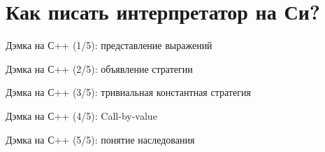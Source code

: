 \section{Как писать интерпретатор на Си?}
\begin{frame}{Дэмка на С++ (1/5): представление выражений}
\cast
\end{frame}

\begin{frame}{Дэмка на С++ (2/5): объявление стратегии}
\strat
\end{frame}

\begin{frame}{Дэмка на С++ (3/5): тривиальная константная стратегия}
\nostrat
\end{frame}

\begin{frame}{Дэмка на С++ (4/5): Call-by-value}
\vspace{-0.5em}
\cbvstrat
\end{frame}
\begin{frame}{Дэмка на С++ (5/5): понятие наследования}
\inheritance
\end{frame}